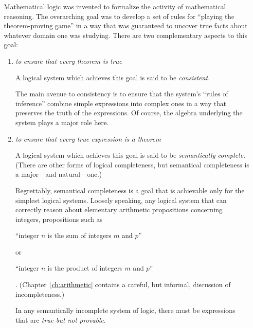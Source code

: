 Mathematical logic was invented to formalize the activity of mathematical reasoning.  The overarching goal was to develop a set of rules for ``playing the theorem-proving game'' in a way that was guaranteed to uncover true facts about whatever domain one was studying.  There are two complementary aspects to this goal:
\begin{enumerate}
\item
{\em to ensure that every theorem is true}

\smallskip


A logical system which achieves this goal is said to be {\it consistent}. 

\smallskip 

The main avenue to consistency is to ensure that the system's ``rules of inference'' combine simple expressions into complex ones in a way that preserves the truth of the expressions.  Of course, the algebra underlying the system plays a major role here.

\medskip\item
{\em to ensure that every true expression is a theorem}

\smallskip


A logical system which achieves this goal is said to be {\it semantically complete}.  (There are other forms of logical completeness, but semantical completeness is a major---and natural---one.)

\smallskip

Regrettably, semantical completeness is a goal that is achievable only for the simplest logical systems.  Loosely speaking, any logical system that can correctly reason about elementary arithmetic propositions concerning integers, propositions such as

\smallskip

\hspace*{.25in}
``integer $n$ is the sum of integers $m$ and $p$''

\noindent or

\hspace*{.25in}
 ``integer $n$ is the product of integers $m$ and $p$''

\smallskip

.  (Chapter~\ref{ch:arithmetic} contains a careful, but informal, discussion of incompleteness.)

\smallskip

In any semantically incomplete system of logic, there must be expressions that are {\em true but not provable}.
\end{enumerate}

